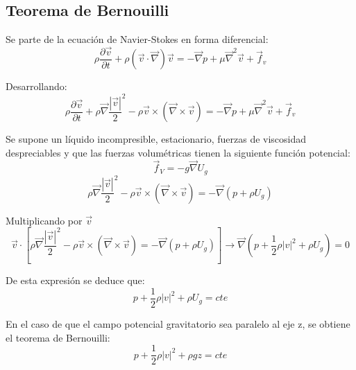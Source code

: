 \subsection{Teorema de Bernouilli}
Se parte de la ecuación de Navier-Stokes en forma diferencial:
\[\rho\frac{\partial \vec{v}}{\partial t}+\rho\left(\vec{v}\cdot\vec{\nabla}\right)\vec{v}=-\vec{\nabla}p+\mu\vec{\nabla}^2\vec{v}+ \vec{f}_v\]

Desarrollando:
\[\rho\frac{\partial \vec{v}}{\partial t}
+
\rho\vec{\nabla}\frac{|\vec{v}|}{2}^2-\rho\vec{v} \times \left(\vec{\nabla}\times\vec{v}\right)
=-\vec{\nabla}p+\mu\vec{\nabla}^2\vec{v}+\vec{f}_v
\]

Se supone un líquido incompresible, estacionario, fuerzas de viscosidad despreciables y que las fuerzas volumétricas tienen la siguiente función potencial:
\[\vec{f}_V=-g\vec{\nabla}U_g\]
\[\rho\vec{\nabla}\frac{|\vec{v}|}{2}^2
-
\rho\vec{v} \times \left(\vec{\nabla}\times\vec{v}\right)
=
-\vec{\nabla}\left(p+\rho U_g\right)\]

Multiplicando por $\vec{v}$
\[\vec{v}\cdot\left[\rho\vec{\nabla}\frac{|\vec{v}|}{2}^2
-
\rho\vec{v} \times \left(\vec{\nabla}\times\vec{v}\right)
=
-\vec{\nabla}\left(p+\rho U_g\right)\right]\rightarrow\vec{\nabla}\left(p+\frac{1}{2}\rho|v|^2+\rho U_g\right)=0\]

De esta expresión se deduce que:
\[p+\frac{1}{2}\rho|v|^2+\rho U_g=cte\]

En el caso de que el campo potencial gravitatorio sea paralelo al eje z, se obtiene el teorema de Bernouilli:
\[p+\frac{1}{2}\rho|v|^2+\rho gz=cte\]
